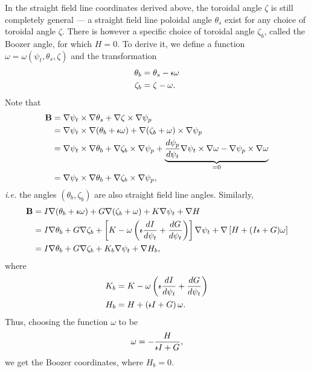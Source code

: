 In the straight field line coordinates derived above, the toroidal angle $\zeta$ is still completely general --- a straight field line poloidal angle $\theta_s$ exist for any choice of toroidal angle $\zeta$. There is however a specific choice of toroidal angle $\zeta_b$, called the Boozer angle, for which $H=0$. To derive it, we define a function $\omega=\omega(\psi_t,\theta_s,\zeta)$ and the transformation
\begin{align}
	\theta_b &= \theta_s -\text{$\iota\!\!$-}\omega\\
	\zeta_b &= \zeta - \omega.
\end{align}
Note that
\begin{align}
	\mathbf{B} &= \nabla\psi_t\times\nabla\theta_s + \nabla\zeta\times\nabla\psi_p\\
	&= \nabla\psi_t\times\nabla(\theta_b+\text{$\iota\!\!$-}\omega) + \nabla(\zeta_b+\omega)\times\nabla\psi_p\\
	&= \nabla\psi_t\times\nabla\theta_b + \nabla\zeta_b\times\nabla\psi_p + \underbrace{\frac{d\psi_p}{d\psi_t}\nabla\psi_t\times\nabla\omega - \nabla\psi_p\times\nabla\omega}_{=0}\\
	&= \nabla\psi_t\times\nabla\theta_b + \nabla\zeta_b\times\nabla\psi_p,
\end{align}
\textit{i.e.} the angles $(\theta_b,\zeta_b)$ are also straight field line angles. Similarly, 
\begin{align}
	\mathbf{B} &= I\nabla(\theta_b+\text{$\iota\!\!$-}\omega) + G\nabla(\zeta_b+\omega) + K \nabla\psi_t + \nabla H\\
	&= I\nabla\theta_b + G\nabla\zeta_b + \left[K-\omega\left(\text{$\iota\!\!$-}\frac{dI}{d\psi_t}+\frac{dG}{d\psi_t}\right)\right]\nabla\psi_t + \nabla\left[H+(I\text{$\iota\!\!$-}+G)\omega\right]\\
	&= I\nabla\theta_b + G\nabla\zeta_b + K_b\nabla\psi_t + \nabla H_b,
\end{align}
where 
\begin{align}
	K_b &= K-\omega\left(\text{$\iota\!\!$-}\frac{dI}{d\psi_t}+\frac{dG}{d\psi_t}\right)\\
	H_b &= H + \left(\text{$\iota\!\!$-} I + G\right) \omega.
\end{align}
Thus, choosing the function $\omega$ to be 
\begin{equation}
	\omega = -\frac{H}{\text{$\iota\!\!$-} I + G},
\end{equation}
we get the Boozer coordinates, where $H_b = 0$.






